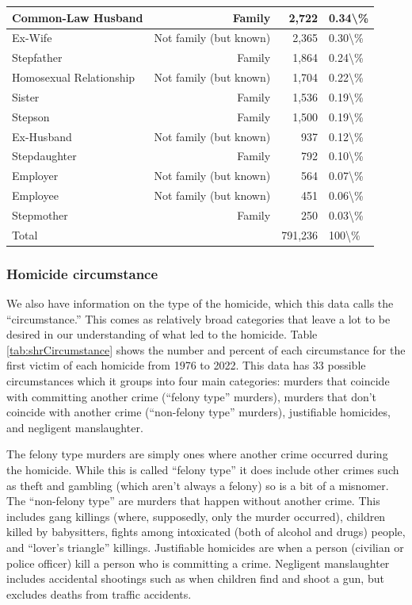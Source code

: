 \documentclass[
]{krantz}
\begin{document}
\begin{longtable}[t]{l|r|r|l}
\hline
Common-Law Husband & Family & 2,722 & 0.34\textbackslash{}\%\\
\hline
Ex-Wife & Not family (but known) & 2,365 & 0.30\textbackslash{}\%\\
\hline
Stepfather & Family & 1,864 & 0.24\textbackslash{}\%\\
\hline
Homosexual Relationship & Not family (but known) & 1,704 & 0.22\textbackslash{}\%\\
\hline
Sister & Family & 1,536 & 0.19\textbackslash{}\%\\
\hline
Stepson & Family & 1,500 & 0.19\textbackslash{}\%\\
\hline
Ex-Husband & Not family (but known) & 937 & 0.12\textbackslash{}\%\\
\hline
Stepdaughter & Family & 792 & 0.10\textbackslash{}\%\\
\hline
Employer & Not family (but known) & 564 & 0.07\textbackslash{}\%\\
\hline
Employee & Not family (but known) & 451 & 0.06\textbackslash{}\%\\
\hline
Stepmother & Family & 250 & 0.03\textbackslash{}\%\\
\hline
Total &  & 791,236 & 100\textbackslash{}\%\\
\hline
\end{longtable}

\subsubsection{Homicide circumstance}\label{circumstance}

We also have information on the type of the homicide, which
this data calls the ``circumstance.'' This comes as
relatively broad categories that leave a lot to be desired
in our understanding of what led to the homicide. Table
\ref{tab:shrCircumstance} shows the number and percent of
each circumstance for the first victim of each homicide from
1976 to 2022. This data has 33 possible circumstances which
it groups into four main categories: murders that coincide
with committing another crime (``felony type'' murders),
murders that don't coincide with another crime (``non-felony
type'' murders), justifiable homicides, and negligent
manslaughter.

The felony type murders are simply ones where another crime
occurred during the homicide. While this is called ``felony
type'' it does include other crimes such as theft and
gambling (which aren't always a felony) so is a bit of a
misnomer. The ``non-felony type'' are murders that happen
without another crime. This includes gang killings (where,
supposedly, only the murder occurred), children killed by
babysitters, fights among intoxicated (both of alcohol and
drugs) people, and ``lover's triangle'' killings.
Justifiable homicides are when a person (civilian or police
officer) kill a person who is committing a crime. Negligent
manslaughter includes accidental shootings such as when
children find and shoot a gun, but excludes deaths from
traffic accidents.
\end{document}
